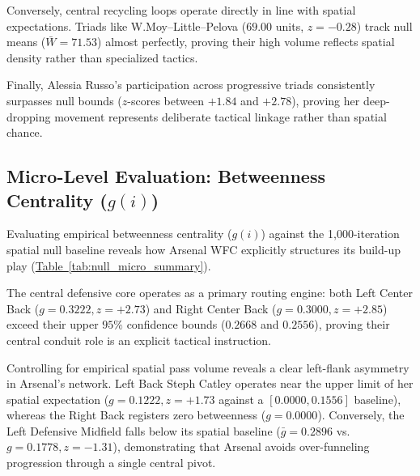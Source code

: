 \documentclass[12pt, a4paper]{article}
\begin{document}
Conversely, central recycling loops operate directly in line with spatial expectations. Triads like W.Moy--Little--Pelova ($69.00$ units, $z = -0.28$) track null means ($\bar{W} = 71.53$) almost perfectly, proving their high volume reflects spatial density rather than specialized tactics.

Finally, Alessia Russo’s participation across progressive triads consistently surpasses null bounds ($z$-scores between $+1.84$ and $+2.78$), proving her deep-dropping movement represents deliberate tactical linkage rather than spatial chance.

\subsection{Micro-Level Evaluation: Betweenness Centrality ($g(i)$)}
\label{subsec:micro_evaluation}

Evaluating empirical betweenness centrality ($g(i)$) against the 1,000-iteration spatial null baseline reveals how Arsenal WFC explicitly structures its build-up play (\hyperref[tab:null_micro_summary]{Table~\ref{tab:null_micro_summary}}).

The central defensive core operates as a primary routing engine: both Left Center Back ($g = 0.3222, z = +2.73$) and Right Center Back ($g = 0.3000, z = +2.85$) exceed their upper $95\%$ confidence bounds ($0.2668$ and $0.2556$), proving their central conduit role is an explicit tactical instruction.

Controlling for empirical spatial pass volume reveals a clear left-flank asymmetry in Arsenal's network. Left Back Steph Catley operates near the upper limit of her spatial expectation ($g = 0.1222, z = +1.73$ against a $[0.0000, 0.1556]$ baseline), whereas the Right Back registers zero betweenness ($g = 0.0000$). Conversely, the Left Defensive Midfield falls below its spatial baseline ($\bar{g} = 0.2896$ vs. $g = 0.1778, z = -1.31$), demonstrating that Arsenal avoids over-funneling progression through a single central pivot.
\end{document}
